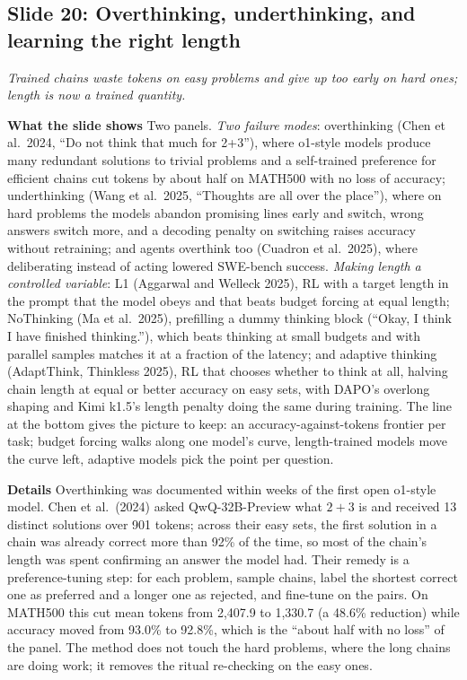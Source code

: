 \documentclass[11pt,letterpaper]{article}
\newcommand{\slide}[3]{%
  \subsection[Slide #1: #2]{Slide #1: #2}%
  {\color{muted}\itshape #3\par}\medskip}
\newcommand{\para}[1]{\medskip\noindent\textbf{#1}\quad}
\begin{document}
\slide{20}{Overthinking, underthinking, and learning the right length}{Trained chains waste tokens on easy problems and give up too early on hard ones; length is now a trained quantity.}

\para{What the slide shows} Two panels. \emph{Two failure modes}: overthinking (Chen et al.\ 2024, ``Do not think that much for 2+3''), where o1-style models produce many redundant solutions to trivial problems and a self-trained preference for efficient chains cut tokens by about half on MATH500 with no loss of accuracy; underthinking (Wang et al.\ 2025, ``Thoughts are all over the place''), where on hard problems the models abandon promising lines early and switch, wrong answers switch more, and a decoding penalty on switching raises accuracy without retraining; and agents overthink too (Cuadron et al.\ 2025), where deliberating instead of acting lowered SWE-bench success. \emph{Making length a controlled variable}: L1 (Aggarwal and Welleck 2025), RL with a target length in the prompt that the model obeys and that beats budget forcing at equal length; NoThinking (Ma et al.\ 2025), prefilling a dummy thinking block (``Okay, I think I have finished thinking.''), which beats thinking at small budgets and with parallel samples matches it at a fraction of the latency; and adaptive thinking (AdaptThink, Thinkless 2025), RL that chooses whether to think at all, halving chain length at equal or better accuracy on easy sets, with DAPO's overlong shaping and Kimi k1.5's length penalty doing the same during training. The line at the bottom gives the picture to keep: an accuracy-against-tokens frontier per task; budget forcing walks along one model's curve, length-trained models move the curve left, adaptive models pick the point per question.

\para{Details} Overthinking was documented within weeks of the first open o1-style model. Chen et al.\ (2024) asked QwQ-32B-Preview what $2+3$ is and received 13 distinct solutions over 901 tokens; across their easy sets, the first solution in a chain was already correct more than 92\% of the time, so most of the chain's length was spent confirming an answer the model had. Their remedy is a preference-tuning step: for each problem, sample chains, label the shortest correct one as preferred and a longer one as rejected, and fine-tune on the pairs. On MATH500 this cut mean tokens from 2,407.9 to 1,330.7 (a 48.6\% reduction) while accuracy moved from 93.0\% to 92.8\%, which is the ``about half with no loss'' of the panel. The method does not touch the hard problems, where the long chains are doing work; it removes the ritual re-checking on the easy ones.
\end{document}
